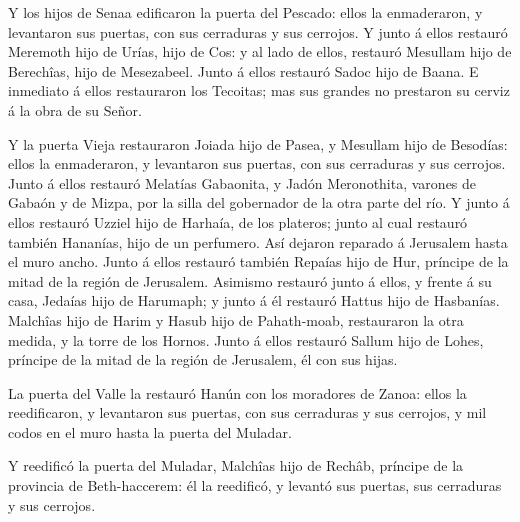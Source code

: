  Y los hijos de Senaa edificaron la puerta del Pescado:
ellos la enmaderaron, y levantaron sus puertas, con sus cerraduras y sus
cerrojos.  Y junto á ellos restauró Meremoth hijo de
Urías, hijo de Cos: y al lado de ellos, restauró Mesullam hijo de
Berechîas, hijo de Mesezabeel. Junto á ellos restauró Sadoc hijo de
Baana.  E inmediato á ellos restauraron los Tecoitas; mas
sus grandes no prestaron su cerviz á la obra de su Señor.

 Y la puerta Vieja restauraron Joiada hijo de Pasea, y
Mesullam hijo de Besodías: ellos la enmaderaron, y levantaron sus
puertas, con sus cerraduras y sus cerrojos.  Junto á ellos
restauró Melatías Gabaonita, y Jadón Meronothita, varones de Gabaón y de
Mizpa, por la silla del gobernador de la otra parte del río.
 Y junto á ellos restauró Uzziel hijo de Harhaía, de los
plateros; junto al cual restauró también Hananías, hijo de un perfumero.
Así dejaron reparado á Jerusalem hasta el muro ancho. 
Junto á ellos restauró también Repaías hijo de Hur, príncipe de la mitad
de la región de Jerusalem.  Asimismo restauró junto á
ellos, y frente á su casa, Jedaías hijo de Harumaph; y junto á él
restauró Hattus hijo de Hasbanías.  Malchîas hijo de
Harim y Hasub hijo de Pahath-moab, restauraron la otra medida, y la
torre de los Hornos.  Junto á ellos restauró Sallum hijo
de Lohes, príncipe de la mitad de la región de Jerusalem, él con sus
hijas.

 La puerta del Valle la restauró Hanún con los moradores
de Zanoa: ellos la reedificaron, y levantaron sus puertas, con sus
cerraduras y sus cerrojos, y mil codos en el muro hasta la puerta del
Muladar.

 Y reedificó la puerta del Muladar, Malchîas hijo de
Rechâb, príncipe de la provincia de Beth-haccerem: él la reedificó, y
levantó sus puertas, sus cerraduras y sus cerrojos.


